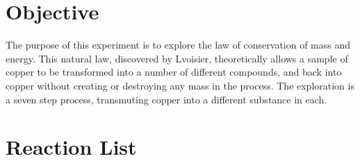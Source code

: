 \documentclass[11pt,letterpaper]{report}
\begin{document}

\pagebreak

\section*{Objective}
The purpose of this experiment is to explore the law of conservation of mass and energy. This natural law, discovered by Lvoisier, theoretically allows a sample of copper to be transformed into a number of different compounds, and back into copper without creating or destroying any mass in the process. The exploration is a seven step process, transmuting copper into a different substance in each.

\section*{Reaction List}
\end{document}
